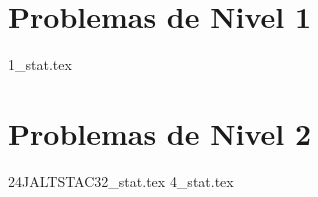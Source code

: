 \section{Problemas de Nivel 1}
{1_stat.tex} %

\section{Problemas de Nivel 2}
{24JALTSTAC32_stat.tex} %
{4_stat.tex} %